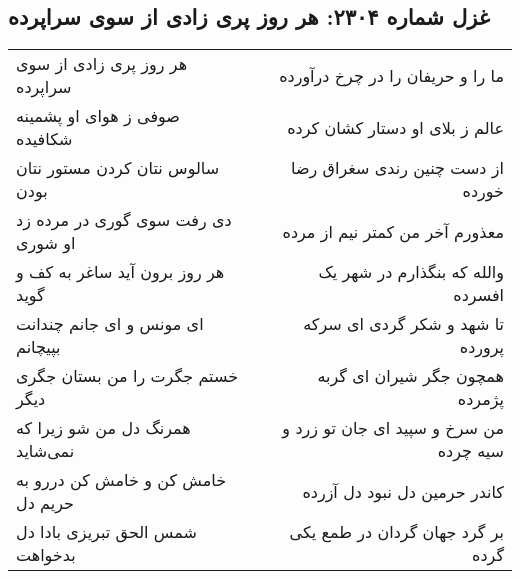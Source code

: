 \begin{center}
\section*{غزل شماره ۲۳۰۴: هر روز پری زادی از سوی سراپرده}
\label{sec:2304}
\begin{longtable}{l p{0.5cm} r}
هر روز پری زادی از سوی سراپرده
&&
ما را و حریفان را در چرخ درآورده
\\
صوفی ز هوای او پشمینه شکافیده
&&
عالم ز بلای او دستار کشان کرده
\\
سالوس نتان کردن مستور نتان بودن
&&
از دست چنین رندی سغراق رضا خورده
\\
دی رفت سوی گوری در مرده زد او شوری
&&
معذورم آخر من کمتر نیم از مرده
\\
هر روز برون آید ساغر به کف و گوید
&&
والله که بنگذارم در شهر یک افسرده
\\
ای مونس و ای جانم چندانت بپیچانم
&&
تا شهد و شکر گردی ای سرکه پرورده
\\
خستم جگرت را من بستان جگری دیگر
&&
همچون جگر شیران ای گربه پژمرده
\\
همرنگ دل من شو زیرا که نمی‌شاید
&&
من سرخ و سپید ای جان تو زرد و سیه چرده
\\
خامش کن و خامش کن دررو به حریم دل
&&
کاندر حرمین دل نبود دل آزرده
\\
شمس الحق تبریزی بادا دل بدخواهت
&&
بر گرد جهان گردان در طمع یکی گرده
\\
\end{longtable}
\end{center}
